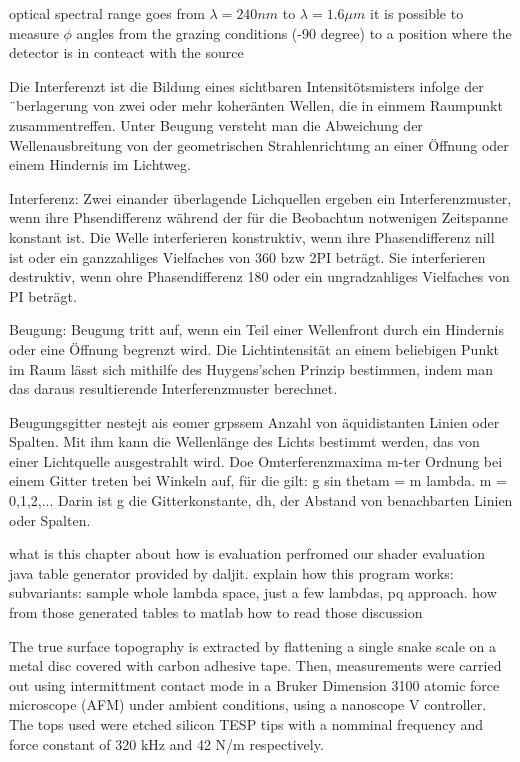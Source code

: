 optical spectral range goes from $\lambda=240 nm$ to $\lambda=1.6 \mu m$
it is possible to measure $\phi$ angles from the grazing conditions (-90 degree) to a position where the detector is in conteact with the source 




Die Interferenzt ist die Bildung eines sichtbaren Intensitötsmisters infolge der ¨berlagerung von zwei oder mehr koheränten Wellen, die in einmem Raumpunkt zusammentreffen. Unter Beugung versteht man die Abweichung der Wellenausbreitung von der geometrischen Strahlenrichtung an einer Öffnung oder einem Hindernis im Lichtweg.

Interferenz: Zwei einander überlagende Lichquellen ergeben ein Interferenzmuster, wenn ihre Phsendifferenz während der für die Beobachtun notwenigen Zeitspanne konstant ist. Die Welle interferieren konstruktiv, wenn ihre Phasendifferenz nill ist oder ein ganzzahliges Vielfaches von 360 bzw 2PI beträgt. Sie interferieren destruktiv, wenn ohre Phasendifferenz 180 oder ein ungradzahliges Vielfaches von PI beträgt.



Beugung: Beugung tritt auf, wenn ein Teil einer Wellenfront durch ein Hindernis oder eine Öffnung begrenzt wird. Die Lichtintensität an einem beliebigen Punkt im Raum lässt sich mithilfe des Huygens'schen Prinzip bestimmen, indem man das daraus resultierende Interferenzmuster berechnet.

Beugungsgitter nestejt ais eomer grpssem Anzahl von äquidistanten Linien oder Spalten. Mit ihm kann die Wellenlänge des Lichts bestimmt werden, das von einer Lichtquelle ausgestrahlt wird. Doe Omterferenzmaxima m-ter Ordnung bei einem Gitter treten bei Winkeln auf, für die gilt: g sin thetam = m lambda. m = 0,1,2,...
Darin ist g die Gitterkonstante, dh, der Abstand von benachbarten Linien oder Spalten.







what is this chapter about
how is evaluation perfromed
our shader
evaluation java table generator provided by daljit.
explain how this program works:
subvariants: sample whole lambda space, just a few lambdas, pq approach.
how from those generated tables to matlab
how to read those
discussion

The true surface topography is extracted by flattening a single snake scale on a metal disc covered with carbon adhesive tape. Then, measurements were carried out using intermittment contact mode in a Bruker Dimension 3100 atomic force microscope (AFM) under ambient conditions, using a nanoscope V controller. The tops used were etched silicon TESP tips with a nomminal frequency and force constant of 320 kHz and 42 N/m respectively. 

